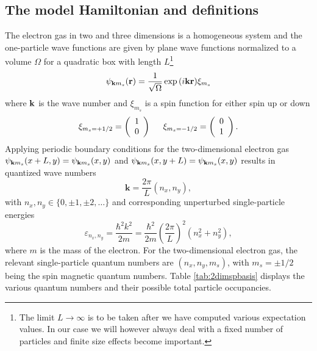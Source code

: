 \documentclass[aps,twocolumn,showpacs,floatfix,nofootinbib,preprintnumbers,superscriptaddress,amsmath,amssymb]{revtex4-1}
\begin{document}
\subsection{The model Hamiltonian and definitions}
\label{subsec:modelHamiltonian}
The electron gas in two and three dimensions  is a homogeneous system and the one-particle wave functions are given by plane wave functions normalized to a volume 
$\Omega$  for a quadratic box with length $L$\footnote{The limit $L\rightarrow \infty$ is to be taken after we have computed various expectation values. In our case we will however always deal with a fixed number of particles and finite size effects become important. }
\[
\psi_{{\bf k}m_s}({\bf r})= \frac{1}{\sqrt{\Omega}}\exp{(i{\bf kr})}\xi_{m_s}
\]
where ${\bf k}$ is the wave number and  $\xi_{m_s}$ is a spin function for either spin up or down
\[ 
\xi_{m_{s}=+1/2}=\left(\begin{array}{c} 1 \\ 0 \end{array}\right) \hspace{0.5cm}
\xi_{m_{s}=-1/2}=\left(\begin{array}{c} 0 \\ 1 \end{array}\right).\]
Applying periodic boundary conditions for the two-dimensional electron gas
$\psi_{{\bf k}m_{s}}(x+L, y) =\psi_{{\bf k}m_{s}}(x,y)$ and $\psi_{{\bf k}m_{s}}(x, y+L) =\psi_{{\bf k}m_{s}}(x,y)$
results in quantized wave numbers
  \[ 
\mathbf{k} = \frac{2\pi }{L}(n_{x}, n_{y}),
\]
with $n_{x}, n_{y}\in \{ 0, \pm 1, \pm 2, \dots \}$ and corresponding unperturbed single-particle energies
\[
    \varepsilon_{n_{x}, n_{y}} = \frac{\hbar^{2}k^{2}}{2m}=\frac{\hbar^{2}}{2m}\left( \frac{2\pi }{L}\right)^{2}(n_{x}^{2}+n_{y}^{2}),
\]
where $m$ is the mass of the electron.
For the two-dimensional electron gas, the relevant single-particle quantum numbers are $(n_{x}, n_{y}, m_{s})$, with $m_s=\pm1/2$ being the 
spin magnetic quantum numbers.
Table \ref{tab:2dimspbasis} displays the various quantum numbers and their possible total particle occupancies. 
\end{document}
